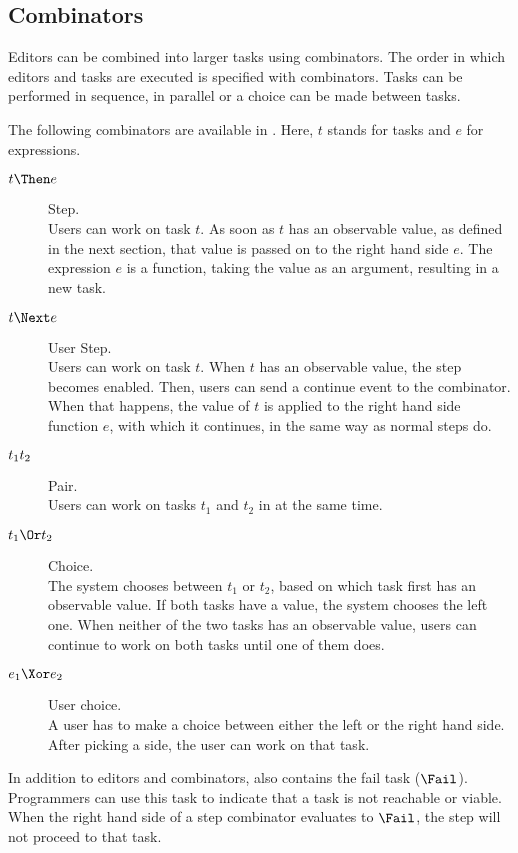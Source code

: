 \subsection{Combinators}
\label{sub:combinators}

Editors can be combined into larger tasks using combinators.
The order in which editors and tasks are executed is specified with combinators. Tasks can be performed in sequence, in parallel or a choice can be made between tasks.


The following combinators are available in \TOPHAT.
Here, $t$ stands for tasks and $e$ for expressions.
\begin{description}
  \item[$t \Then e$] Step.\\
    Users can work on task $t$.
    As soon as $t$ has an observable value, as defined in the next section, that value is passed on to the right hand side $e$.
    The expression $e$ is a function, taking the value as an argument, resulting in a new task.
  \item[$t \Next e$] User Step.\\
    Users can work on task $t$.
    When $t$ has an observable value, the step becomes enabled.
    Then, users can send a continue event to the combinator.
    When that happens, the value of $t$ is applied to the right hand side function $e$, with which it continues,
    in the same way as normal steps do.
  \item[$t_1 \relax t_2$] Pair.\\
    Users can work on tasks $t_1$ and $t_2$ in at the same time.
  \item[$t_1 \Or t_2$] Choice.\\
    The system chooses between $t_1$ or $t_2$,
    based on which task first has an observable value.
    If both tasks have a value, the system chooses the left one.
    When neither of the two tasks has an observable value, users can continue to work on both tasks until one of them does.
  \item[$e_1 \Xor e_2$] User choice.\\
    A user has to make a choice between either the left or the right hand side.
    After picking a side, the user can work on that task.
\end{description}

In addition to editors and combinators, \TOPHAT also contains the fail task ($\Fail$).
Programmers can use this task to indicate that a task is not reachable or viable.
When the right hand side of a step combinator evaluates to $\Fail$, the step will not proceed to that task.



